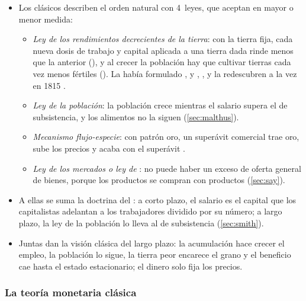 \documentclass[11pt]{article}
\begin{document}
\begin{itemize}
\item Los clásicos describen el orden natural con 4~leyes, que aceptan en mayor o menor medida:
  \begin{itemize}
  \item \emph{Ley de los rendimientos decrecientes de la tierra}: con la tierra fija, cada nueva dosis de trabajo y capital aplicada a una tierra dada rinde menos que la anterior (), y al crecer la población hay que cultivar tierras cada vez menos fértiles (). La había formulado \textcite{Turgot1767Observations}, y , ,  y  la redescubren a la vez en 1815\nocite{Humphrey1997Algebraic} .
  \item \emph{Ley de la población}: la población crece mientras el salario supera el de subsistencia, y los alimentos no la siguen\nocite{Malthus1798Essay} (\ref{sec:malthus}).
  \item \emph{Mecanismo flujo-especie}: con patrón oro, un superávit comercial trae oro, sube los precios y acaba con el superávit\nocite{Hume1752Balance} .
  \item \emph{Ley de los mercados o ley de }: no puede haber un exceso de oferta general de bienes, porque los productos se compran con productos (\ref{sec:say}).
  \end{itemize}
\item A ellas se suma la doctrina del : a corto plazo, el salario es el capital que los capitalistas adelantan a los trabajadores dividido por su número; a largo plazo, la ley de la población lo lleva al de subsistencia (\ref{sec:smith}).
\item Juntas dan la visión clásica del largo plazo: la acumulación hace crecer el empleo, la población lo sigue, la tierra peor encarece el grano y el beneficio cae hasta el estado estacionario; el dinero solo fija los precios.
\end{itemize}

\subsubsection{La teoría monetaria clásica}\label{sec:dinero}
\end{document}
